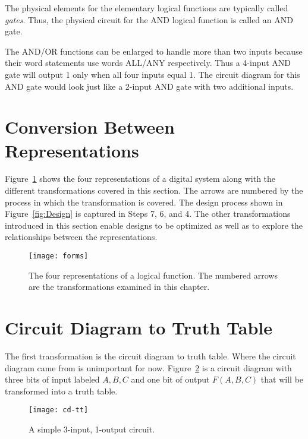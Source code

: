 The physical elements for the elementary logical functions are
typically called \textit{gates}.   Thus, the physical circuit for 
the AND logical function is called an AND gate.

The AND/OR functions can be enlarged to handle more than
two inputs because their word statements use words ALL/ANY
respectively.  Thus a 4-input AND gate will output 1
only when all four inputs equal 1.  The circuit diagram for 
this AND gate would look just like a 2-input AND gate with
two additional inputs.

\section{Conversion Between Representations}
Figure~\ref{fig:representationsForms} shows the four representations of a digital system
along with the different transformations covered in this section.  
The arrows are numbered by the process in which the transformation is
covered.  The design process shown in Figure~\ref{fig:Design} is captured
in Steps 7, 6, and 4.  The other transformations introduced in this 
section enable designs to be optimized as well as to explore 
the relationships between the representations.

\begin{figure}[ht]
\texttt{[image: forms]}
\caption{The four representations of a logical function.  The
numbered arrows are the transformations examined in this chapter.}
\label{fig:representationsForms}
\end{figure}

\section{Circuit Diagram to Truth Table}

The first transformation is the circuit diagram to truth table.  
Where the circuit diagram came from is unimportant for now.
Figure~\ref{fig:representationsCD-TT} is a circuit diagram with three bits of 
input labeled $A,B,C$ and one bit of output $F(A,B,C)$ that will
be transformed into a truth table.

\begin{figure}[ht]
\texttt{[image: cd-tt]}
\caption{A simple 3-input, 1-output circuit.}
\label{fig:representationsCD-TT}
\end{figure}

